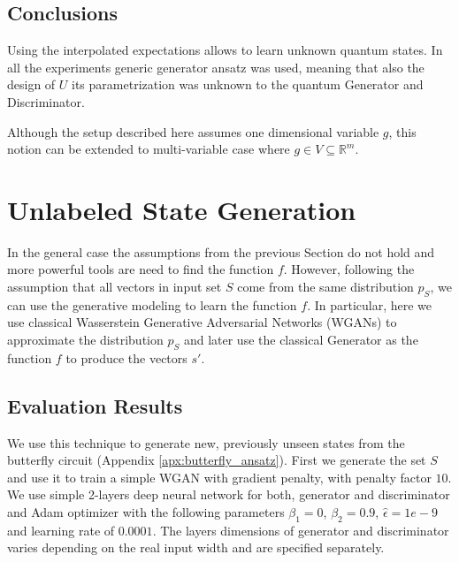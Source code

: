 \subsection{Conclusions}
Using the interpolated expectations allows to learn unknown quantum states.
In all the experiments generic generator ansatz was used, meaning that also the
design of $U$ its parametrization was unknown to the quantum Generator and
Discriminator.

Although the setup described here assumes one dimensional variable $g$, this
notion can be extended to multi-variable case where $g \in V \subseteq
\mathbb{R}^m$.



\section{Unlabeled State Generation}
In the general case the assumptions from the previous Section do not hold and
more powerful tools are need to find the function $f$. However, following the assumption
that all vectors in input set $S$ come from the same distribution $p_S$, we can use
the generative modeling to learn the function $f$. In particular, here we use
classical Wasserstein Generative Adversarial Networks (WGANs) to approximate the
distribution $p_S$ and later use the classical Generator as the function $f$ to
produce the vectors $s'$. 

\subsection{Evaluation Results}
We use this technique to generate new, previously unseen states from the butterfly circuit
(Appendix \ref{apx:butterfly_ansatz}). First we generate the set $S$ and use it
to train a simple WGAN with gradient penalty\cite{gulrajani2017improved}, with
penalty factor $10$. We use
simple 2-layers deep neural network for both, generator and discriminator and Adam
optimizer \cite{kingma2017adam} with the following parameters $\beta_1 = 0$,
$\beta_2 = 0.9$, $\hat{\epsilon} = 1e - 9$ and learning rate of $0.0001$. The layers
dimensions of generator and discriminator varies depending on the real input width 
and are specified separately.

